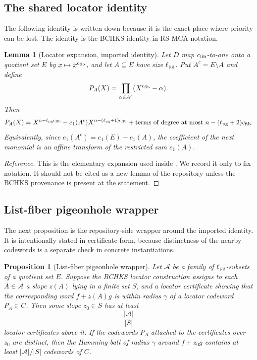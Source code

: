 \documentclass[11pt]{article}
\newtheorem{lemma}{Lemma}
\newtheorem{proposition}{Proposition}
\newcommand{\efib}{c_{\rm fib}}
\newcommand{\ellpg}{\ell_{\rm pg}}
\begin{document}
\subsection{The shared locator identity}

The following identity is written down because it is the exact place where
priority can be lost.  The identity is the BCHKS identity in RS-MCA notation.

\begin{lemma}[Locator expansion, imported identity]
\label{lem:locator-imported}
Let \(D\) map \(\efib\)-to-one onto a quotient set \(E\) by
\(x\mapsto x^{\efib}\), and let \(A\subseteq E\) have size \(\ellpg\).  Put
\(A^c=E\setminus A\) and define
\[
  P_A(X)=\prod_{\alpha\in A^c}(X^{\efib}-\alpha).
\]
Then
\[
  P_A(X)
  =X^{n-\ellpg\efib}
    -e_1(A^c)X^{n-(\ellpg+1)\efib}
    +\text{terms of degree at most }n-(\ellpg+2)\efib.
\]
Equivalently, since \(e_1(A^c)=e_1(E)-e_1(A)\), the coefficient of the next
monomial is an affine transform of the restricted sum \(e_1(A)\).
\end{lemma}

\begin{proof}[Reference]
This is the elementary expansion used inside \cite[Thm.~7.1]{BCHKS25}.  We
record it only to fix notation.  It should not be cited as a new lemma of the
repository unless the BCHKS provenance is present at the statement.
\end{proof}

\subsection{List-fiber pigeonhole wrapper}

The next proposition is the repository-side wrapper around the imported
identity.  It is intentionally stated in certificate form, because distinctness
of the nearby codewords is a separate check in concrete instantiations.

\begin{proposition}[List-fiber pigeonhole wrapper]
\label{prop:list-fiber-wrapper}
Let \(\mathcal A\) be a family of \(\ellpg\)-subsets of a quotient set \(E\).
Suppose the BCHKS locator construction assigns to each \(A\in\mathcal A\) a
slope \(z(A)\) lying in a finite set \(S\), and a locator certificate showing
that the corresponding word \(f+z(A)g\) is within radius \(\gamma\) of a
locator codeword \(P_A\in C\).  Then some slope \(z_0\in S\) has at least
\[
  \frac{|\mathcal A|}{|S|}
\]
locator certificates above it.  If the codewords \(P_A\) attached to the
certificates over \(z_0\) are distinct, then the Hamming ball of radius
\(\gamma\) around \(f+z_0g\) contains at least \(|\mathcal A|/|S|\) codewords
of \(C\).
\end{proposition}
\end{document}
